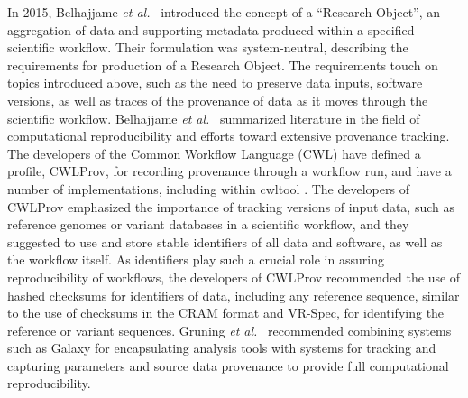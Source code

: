 In 2015, Belhajjame \textit{et al.}~\cite{Belhajjame2015} introduced
the concept of a ``Research Object'', an aggregation of data and
supporting metadata produced within a specified scientific
workflow. Their formulation was system-neutral, describing the
requirements for production of a Research Object. The requirements
touch on topics introduced above, such as the need to preserve data
inputs, software versions, as well as traces of the provenance of data
as it moves through the scientific workflow. Belhajjame
\textit{et al.}~\cite{Belhajjame2015} summarized literature in the field of
computational reproducibility and efforts toward extensive provenance
tracking. The developers of the Common Workflow Language (CWL)
\cite{cwl} have defined a profile, CWLProv, for recording provenance
through a workflow run, and have a number of implementations,
including within cwltool \cite{Khan2018}. The developers of CWLProv
emphasized the importance of tracking versions of input data, such as
reference genomes or variant databases in a scientific workflow, and
they suggested to use and store stable identifiers of all data and
software, as well as the workflow itself. As identifiers play such a
crucial role in assuring reproducibility of workflows, the developers
of CWLProv recommended the use of hashed checksums for identifiers of
data, including any reference sequence, similar to the use of
checksums in the CRAM format and VR-Spec, for identifying the
reference or variant sequences. Gruning
\textit{et al.}~\cite{Gruning2018} recommended combining systems such as Galaxy
for encapsulating analysis tools with systems for tracking and
capturing parameters and source data provenance to provide full
computational reproducibility.

